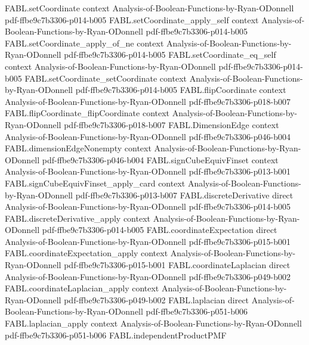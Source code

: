 \begin{theorem}
  {FABL.setCoordinate}
  {context}
  {Analysis-of-Boolean-Functions-by-Ryan-ODonnell}
  {pdf-ffbe9c7b3306-p014-b005}
\proofstep
  {FABL.setCoordinate_apply_self}
  {context}
  {Analysis-of-Boolean-Functions-by-Ryan-ODonnell}
  {pdf-ffbe9c7b3306-p014-b005}
\proofstep
  {FABL.setCoordinate_apply_of_ne}
  {context}
  {Analysis-of-Boolean-Functions-by-Ryan-ODonnell}
  {pdf-ffbe9c7b3306-p014-b005}
\proofstep
  {FABL.setCoordinate_eq_self}
  {context}
  {Analysis-of-Boolean-Functions-by-Ryan-ODonnell}
  {pdf-ffbe9c7b3306-p014-b005}
\proofstep
  {FABL.setCoordinate_setCoordinate}
  {context}
  {Analysis-of-Boolean-Functions-by-Ryan-ODonnell}
  {pdf-ffbe9c7b3306-p014-b005}
\proofstep
  {FABL.flipCoordinate}
  {context}
  {Analysis-of-Boolean-Functions-by-Ryan-ODonnell}
  {pdf-ffbe9c7b3306-p018-b007}
\proofstep
  {FABL.flipCoordinate_flipCoordinate}
  {context}
  {Analysis-of-Boolean-Functions-by-Ryan-ODonnell}
  {pdf-ffbe9c7b3306-p018-b007}
\proofstep
  {FABL.DimensionEdge}
  {context}
  {Analysis-of-Boolean-Functions-by-Ryan-ODonnell}
  {pdf-ffbe9c7b3306-p046-b004}
\proofstep
  {FABL.dimensionEdgeNonempty}
  {context}
  {Analysis-of-Boolean-Functions-by-Ryan-ODonnell}
  {pdf-ffbe9c7b3306-p046-b004}
\proofstep
  {FABL.signCubeEquivFinset}
  {context}
  {Analysis-of-Boolean-Functions-by-Ryan-ODonnell}
  {pdf-ffbe9c7b3306-p013-b001}
\proofstep
  {FABL.signCubeEquivFinset_apply_card}
  {context}
  {Analysis-of-Boolean-Functions-by-Ryan-ODonnell}
  {pdf-ffbe9c7b3306-p013-b007}
\proofstep
  {FABL.discreteDerivative}
  {direct}
  {Analysis-of-Boolean-Functions-by-Ryan-ODonnell}
  {pdf-ffbe9c7b3306-p014-b005}
\proofstep
  {FABL.discreteDerivative_apply}
  {context}
  {Analysis-of-Boolean-Functions-by-Ryan-ODonnell}
  {pdf-ffbe9c7b3306-p014-b005}
\proofstep
  {FABL.coordinateExpectation}
  {direct}
  {Analysis-of-Boolean-Functions-by-Ryan-ODonnell}
  {pdf-ffbe9c7b3306-p015-b001}
\proofstep
  {FABL.coordinateExpectation_apply}
  {context}
  {Analysis-of-Boolean-Functions-by-Ryan-ODonnell}
  {pdf-ffbe9c7b3306-p015-b001}
\proofstep
  {FABL.coordinateLaplacian}
  {direct}
  {Analysis-of-Boolean-Functions-by-Ryan-ODonnell}
  {pdf-ffbe9c7b3306-p049-b002}
\proofstep
  {FABL.coordinateLaplacian_apply}
  {context}
  {Analysis-of-Boolean-Functions-by-Ryan-ODonnell}
  {pdf-ffbe9c7b3306-p049-b002}
\proofstep
  {FABL.laplacian}
  {direct}
  {Analysis-of-Boolean-Functions-by-Ryan-ODonnell}
  {pdf-ffbe9c7b3306-p051-b006}
\proofstep
  {FABL.laplacian_apply}
  {context}
  {Analysis-of-Boolean-Functions-by-Ryan-ODonnell}
  {pdf-ffbe9c7b3306-p051-b006}
\proofstep
  {FABL.independentProductPMF}

\end{theorem}
